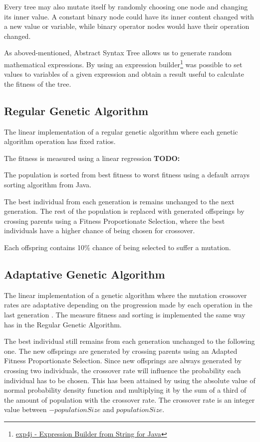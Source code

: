 \documentclass[runningheads]{llncs}
\begin{document}
Every tree may also mutate itself by randomly choosing one node and changing its inner value. A constant binary node could have its inner content changed with a new value or variable, while binary operator nodes would have their operation changed.

As aboved-mentioned, Abstract Syntax Tree allows us to generate random mathematical expressions. By using an expression builder\footnote{\href{https://www.objecthunter.net/exp4j/index.htm}{exp4j - Expression Builder from String for Java}} was possible to set values to variables of a given expression and obtain a result useful to calculate the fitness of the tree.

\subsection{Regular Genetic Algorithm}
The linear implementation of a regular genetic algorithm where each genetic algorithm operation has fixed ratios. 

The fitness is measured using a linear regression \textbf{TODO:} %

The population is sorted from best fitness to worst fitness using a default arrays sorting algorithm from Java.

The best individual from each generation is remains unchanged to the next generation. The rest of the population is replaced with generated offsprings by crossing parents using a Fitness Proportionate Selection, where the best individuals have a higher chance of being chosen for crossover.

Each offspring contains 10\% chance of being selected to suffer a mutation.

\subsection{Adaptative Genetic Algorithm}
The linear implementation of a genetic algorithm where the mutation crossover rates are adaptative  depending on the progression made by each operation in the last generation \cite{adaptativeCrossOverMutation}. The measure fitness and sorting is implemented the same way has in the Regular Genetic Algorithm.

The best individual still remains from each generation unchanged to the following one. The new offsprings are generated by crossing parents using an Adapted Fitness Proportionate Selection. Since new offsprings are always generated by crossing two individuals, the crossover rate will influence the probability each individual has to be chosen. This has been attained by using the absolute value of  normal probability density function and multiplying it by the sum of a third of the amount of population with the crossover rate. The crossover rate is an integer value between \(-populationSize\) and \(populationSize\).
\end{document}
